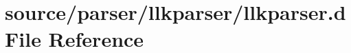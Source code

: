 \hypertarget{llkparser_8d}{
\section{source/parser/llkparser/llkparser.d File Reference}
\label{llkparser_8d}
}
